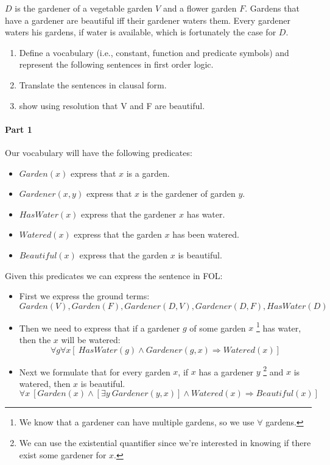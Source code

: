 \documentclass[10pt,a4paper]{article}
\begin{document}
\begin{itemize}
$D$ is the gardener of a vegetable garden $V$ and a flower garden $F$. Gardens that have a gardener are beautiful iff their gardener waters them. Every gardener waters his gardens, if water is available, which is fortunately the case for $D$.
\begin{enumerate}
\item  Define a vocabulary (i.e., constant, function and predicate symbols) and represent the following sentences in first order logic.
\item Translate the sentences in clausal form.
\item show using resolution that V and F are beautiful.
\end{enumerate}


\paragraph{Part 1}
Our vocabulary will have the following predicates:
\begin{itemize}
\item $Garden(x)$ express that $x$ is a garden.
\item $Gardener(x,y)$ express that $x$ is the gardener of garden $y$.
\item $HasWater(x)$ express that the gardener $x$ has water.
\item $Watered(x)$ express that the garden $x$ has been watered.
\item $Beautiful(x)$ express that the garden $x$ is beautiful.
\end{itemize}

Given this predicates we can express the sentence in FOL:
\begin{itemize}
\item First we express the ground terms:
\[ Garden(V), Garden(F), Gardener(D,V), Gardener(D,F), HasWater(D)\]
\item Then we need to express that if a gardener $g$ of some garden $x$ \footnote{We know that a gardener can have multiple gardens, so we use $\forall$ gardens.} has water, then the $x$ will be watered:
\[\forall g \forall x[\ HasWater(g)\wedge Gardener(g,x)\Rightarrow Watered(x)]\]
\item Next we formulate that for every garden $x$, if $x$ has a gardener $y$ \footnote{We can use the existential quantifier since we're interested in knowing if there exist some gardener for $x$. } and $x$ is watered, then $x$ is beautiful.
\[\forall x\ [Garden(x)\wedge [\exists y\ Gardener(y,x)]\wedge Watered(x)\Rightarrow Beautiful(x)]\]
\end{itemize}


\end{itemize}
\end{document}
